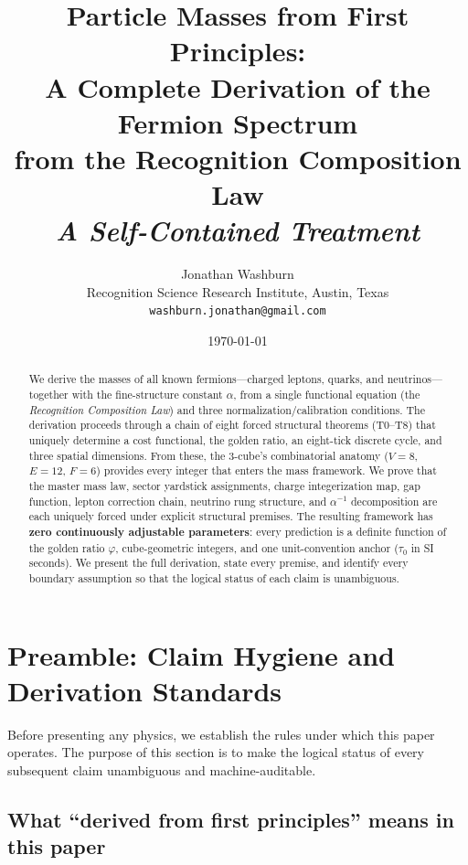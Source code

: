 \documentclass[11pt,a4paper]{article}
\title{\textbf{Particle Masses from First Principles:\\
A Complete Derivation of the Fermion Spectrum\\
from the Recognition Composition Law}\\[0.5em]
\large \textit{A Self-Contained Treatment}}
\author{Jonathan Washburn\\
\small Recognition Science Research Institute, Austin, Texas\\
\small \texttt{washburn.jonathan@gmail.com}}
\date{\today}
\theoremstyle{definition}
\theoremstyle{remark}
\newcommand{\phig}{\varphi}
\begin{document}
\maketitle

\begin{abstract}
We derive the masses of all known fermions---charged leptons, quarks, and
neutrinos---together with the fine-structure constant $\alpha$, from a
single functional equation (the \emph{Recognition Composition Law}) and three
normalization/calibration conditions.  The derivation proceeds through a chain
of eight forced structural theorems (T0--T8) that uniquely determine a cost
functional, the golden ratio, an eight-tick discrete cycle, and three spatial
dimensions.  From these, the 3-cube's combinatorial anatomy
($V\!=\!8$, $E\!=\!12$, $F\!=\!6$) provides every integer that enters the mass
framework.  We prove that the master mass law, sector yardstick assignments,
charge integerization map, gap function, lepton correction chain, neutrino
rung structure, and $\alpha^{-1}$ decomposition are each uniquely forced under
explicit structural premises.  The resulting framework has \textbf{zero
continuously adjustable parameters}: every prediction is a definite function
of the golden ratio $\phig$, cube-geometric integers, and one unit-convention
anchor ($\tau_0$ in SI seconds).  We present the full derivation,
state every premise, and identify every boundary assumption so that the
logical status of each claim is unambiguous.
\end{abstract}

\tableofcontents
\newpage


\section{Preamble: Claim Hygiene and Derivation Standards}
\label{sec:preamble}

Before presenting any physics, we establish the rules under which this paper
operates.  The purpose of this section is to make the logical status of every
subsequent claim unambiguous and machine-auditable.

\subsection{What ``derived from first principles'' means in this paper}
\end{document}
